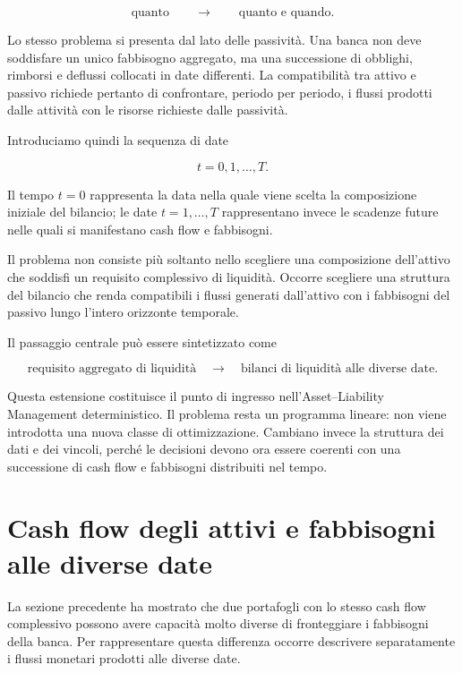 \[
\text{quanto}
\qquad\longrightarrow\qquad
\text{quanto e quando}.
\]

Lo stesso problema si presenta dal lato delle passivit\`a. Una banca non deve
soddisfare un unico fabbisogno aggregato, ma una successione di obblighi,
rimborsi e deflussi collocati in date differenti. La compatibilit\`a tra
attivo e passivo richiede pertanto di confrontare, periodo per periodo, i
flussi prodotti dalle attivit\`a con le risorse richieste dalle passivit\`a.

Introduciamo quindi la sequenza di date

\[
t=0,1,\ldots,T.
\]

Il tempo $t=0$ rappresenta la data nella quale viene scelta la composizione
iniziale del bilancio; le date $t=1,\ldots,T$ rappresentano invece le
scadenze future nelle quali si manifestano cash flow e fabbisogni.

Il problema non consiste pi\`u soltanto nello scegliere una composizione
dell'attivo che soddisfi un requisito complessivo di liquidit\`a. Occorre
scegliere una struttura del bilancio che renda compatibili i flussi generati
dall'attivo con i fabbisogni del passivo lungo l'intero orizzonte temporale.

Il passaggio centrale pu\`o essere sintetizzato come

\[
\boxed{
\text{requisito aggregato di liquidit\`a}
\quad\longrightarrow\quad
\text{bilanci di liquidit\`a alle diverse date}.
}
\]

Questa estensione costituisce il punto di ingresso
nell'Asset--Liability Management deterministico. Il problema resta un
programma lineare: non viene introdotta una nuova classe di ottimizzazione.
Cambiano invece la struttura dei dati e dei vincoli, perch\'e le decisioni
devono ora essere coerenti con una successione di cash flow e fabbisogni
distribuiti nel tempo.

\section{Cash flow degli attivi e fabbisogni alle diverse date}

\label{sec:cap12-cash-flow-fabbisogni}

La sezione precedente ha mostrato che due portafogli con lo stesso cash flow
complessivo possono avere capacit\`a molto diverse di fronteggiare i
fabbisogni della banca. Per rappresentare questa differenza occorre descrivere
separatamente i flussi monetari prodotti alle diverse date.

